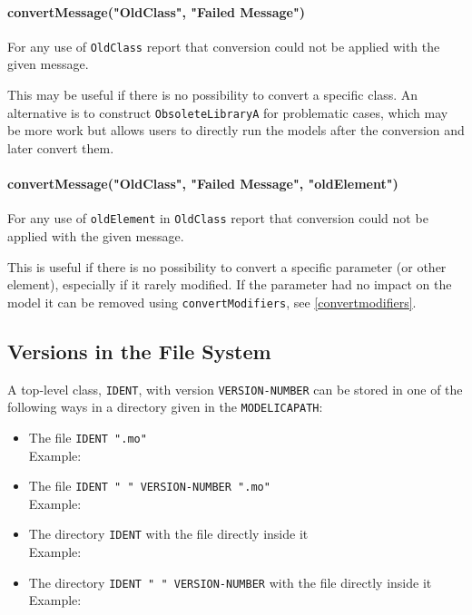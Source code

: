 \paragraph*{convertMessage("OldClass", "Failed Message")}\label{convertmessageoldclass-failed-message}

For any use of \lstinline!OldClass! report that conversion could not be applied with the given message.

\begin{nonnormative}
This may be useful if there is no possibility to convert a specific class.
An alternative is to construct \lstinline!ObsoleteLibraryA! for problematic cases, which may be more work but allows users to directly run the models after the conversion and later convert them.
\end{nonnormative}

\paragraph*{convertMessage("OldClass", "Failed Message", "oldElement")}\label{convertmessageoldclass-failed-message2}

For any use of \lstinline!oldElement! in \lstinline!OldClass! report that conversion could not be applied with the given message.

\begin{nonnormative}
This is useful if there is no possibility to convert a specific parameter (or other element), especially if it rarely modified.
If the parameter had no impact on the model it can be removed using \lstinline!convertModifiers!, see \cref{convertmodifiers}.
\end{nonnormative}

\subsection{Versions in the File System}\label{mapping-of-versions-to-file-system}\label{versions-in-the-File-System}

A top-level class, \lstinline!IDENT!, with version \lstinline!VERSION-NUMBER! can be stored in one of the following ways in a directory given in the \lstinline!MODELICAPATH!:
\begin{itemize}
\item
  The file \lstinline!IDENT ".mo"!\\
  Example: 
\item
  The file \lstinline!IDENT " " VERSION-NUMBER ".mo"!\\
  Example: 
\item
  The directory \lstinline!IDENT! with the file  directly inside it\\
  Example: 
\item
  The directory \lstinline!IDENT " " VERSION-NUMBER! with the file  directly inside it\\
  Example: 
\end{itemize}

